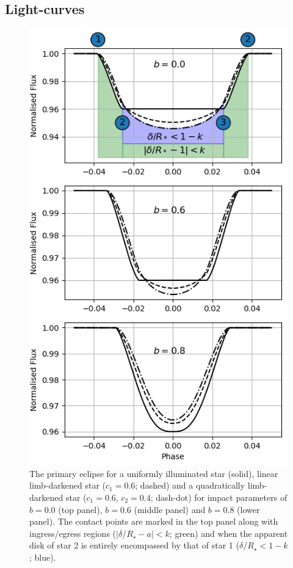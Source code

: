 \subsection{Light-curves}



\begin{figure}
    \centering
    \includegraphics[height=0.8\textheight]{4-images/transit_1.png}
    \caption{The primary eclipse for a uniformly illuminated star (solid), linear limb-darkened star ($c_1 = 0.6$; dashed) and a quadratically limb-darkened star ($c_1 = 0.6$, $c_2 = 0.4$; dash-dot) for impact parameters of $b = 0.0$ (top panel), $b=0.6$ (middle panel) and $b=0.8$ (lower panel). The contact points are marked in the top panel along with ingress/egress regions ($|\delta / R_\star - a| < k$; green) and when the apparent disk of star 2 is entirely encompassed by that of star 1 ($\delta / R_\star < 1-k$; blue). }
    \label{theory:fig:transit_1}
\end{figure}


